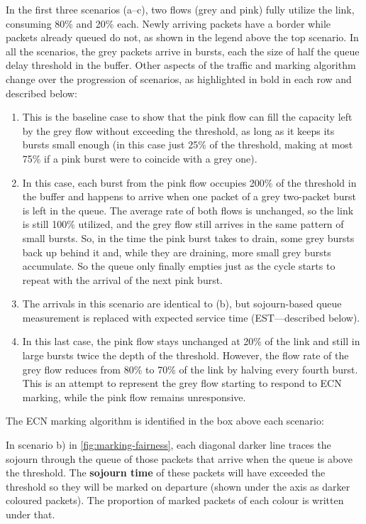 In the first three scenarios (a--c), two flows (grey and pink) fully utilize the link, consuming 80\% and 20\% each. Newly arriving packets have a border while packets already queued do not, as shown in the legend above the top scenario. In all the scenarios, the grey packets arrive in bursts, each the size of half the queue delay threshold in the buffer. Other aspects of the traffic and marking algorithm change over the progression of scenarios, as highlighted in bold in each row and described below:
\begin{enumerate}[nosep, label=\alph*)]
	\item This is the baseline case to show that the pink flow can fill the capacity left by the grey flow without exceeding the threshold, as long as it keeps its bursts small enough (in this case just 25\% of the threshold, making at most 75\% if a pink burst were to coincide with a grey one). 
	\item In this case, each burst from the pink flow occupies 200\% of the threshold in the buffer and happens to arrive when one packet of a grey two-packet burst is left in the queue. The average rate of both flows is unchanged, so the link is still 100\% utilized, and the grey flow still arrives in the same pattern of small bursts. So, in the time the pink burst takes to drain, some grey bursts back up behind it and, while they are draining, more small grey bursts accumulate. So the queue only finally empties just as the cycle starts to repeat with the arrival of the next pink burst.
	\item The arrivals in this scenario are identical to (b), but sojourn-based queue measurement is replaced with expected service time (EST---described below).
	\item In this last case, the pink flow stays unchanged at 20\% of the link and still in large bursts twice the depth of the threshold. However, the flow rate of the grey flow reduces from 80\% to 70\% of the link by halving every fourth burst. This is an attempt to represent the grey flow starting to respond to ECN marking, while the pink flow remains unresponsive.
\end{enumerate}

The ECN marking algorithm is identified in the box above each scenario:

In scenario b) in \autoref{fig:marking-fairness}, each diagonal darker line traces the sojourn through the queue of those packets that arrive when the queue is above the threshold. The \textbf{sojourn time} of these packets will have exceeded the threshold so they will be marked on departure (shown under the axis as darker coloured packets). The proportion of marked packets of each colour is written under that.


